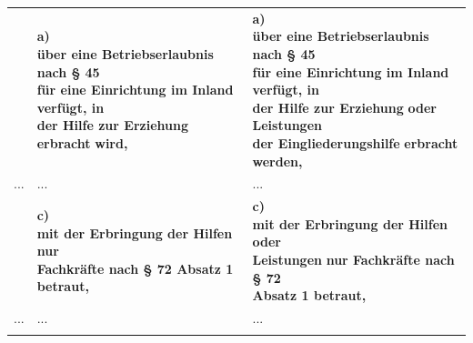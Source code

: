 \documentclass[10pt,a4paper,landscape]{article}
\begin{document}
\begin{longtable}{|L{8.2cm}|L{8.2cm}|L{8.2cm}|}
 & \textbf{a)   \newline über eine Betriebserlaubnis nach \S{} 45  \newline für eine Einrichtung im Inland verfügt, in  \newline der Hilfe zur Erziehung erbracht }\textbf{\textcolor{diffred}{wird,}} & \textbf{a)   \newline über eine Betriebserlaubnis nach \S{} 45  \newline für eine Einrichtung im Inland verfügt, in  \newline der Hilfe zur Erziehung }\textbf{\textcolor{diffgreen}{oder Leistungen  \newline der Eingliederungshilfe}}\textbf{ erbracht} \newline \textbf{\textcolor{diffgreen}{werden,}} \\
\hhline{|---|}
... & ... & ... \\
\hhline{|---|}
 & \textbf{c)   \newline mit der Erbringung der Hilfen nur  \newline Fachkräfte nach \S{} 72 Absatz 1 betraut, } & \textbf{c)   \newline mit der Erbringung der Hilfen }\textbf{\textcolor{diffgreen}{oder  \newline Leistungen}}\textbf{ nur Fachkräfte nach \S{} 72  \newline Absatz 1 betraut, } \\
\hhline{|---|}
... & ... & ... \\
\hhline{|---|}

\end{longtable}
\end{document}
